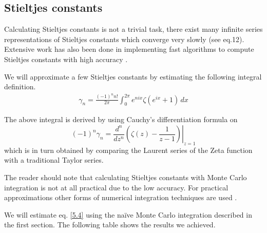 \documentclass[12pt]{article}
\numberwithin{equation}{section}
\begin{document}
\subsection{Stieltjes constants}
Calculating Stieltjes constants is not a trivial task, there exist many infinite series representations of Stieltjes constants which converge very slowly \cite{stieltjeswolfram} (see eq.12). Extensive work has also been done in implementing fast algorithms to compute Stieltjes constants with high accuracy \cite{johansson2018computing}.
\par We will approximate a few Stieltjes constants by estimating the following integral definition.
\begin{align}
    \gamma_n = \frac{(-1)^n n!}{2 \pi} \int_0^{2 \pi} e^{nix} \zeta (e^{ix}+1)\, dx \label{5.4}
\end{align}
\par The above integral is derived by using Cauchy's differentiation formula on $$(-1)^n \gamma_n= \frac{d^n}{dz^n} \left. \left ( \zeta(z) - \frac{1}{z-1}\right)\right|_{z=1}$$
which is in turn obtained by comparing the Laurent series of the Zeta function with a traditional Taylor series.
\par The reader should note that calculating Stieltjes constants with Monte Carlo integration is not at all practical due to the low accuracy. For practical approximations other forms of numerical integration techniques are used \cite{johansson2018computing, newtoncotes}.
\par We will estimate eq. \ref{5.4} using the naïve Monte Carlo integration described in the first section. The following table shows the results we achieved.
\end{document}
